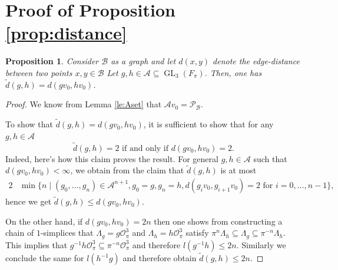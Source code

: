 \documentclass{eptcs}
\newtheorem{proposition}[theorem]{Proposition}
\theoremstyle{remark}
\theoremstyle{definition}
\DeclareMathOperator{\GL}{GL}
\begin{document}
\section{Proof of Proposition \ref{prop:distance}}
\label{proofoflemma5.5}
\begin{proposition}
    Consider $\mathcal{B}$ as a graph and let $d(x,y)$ denote the edge-distance between two points $x,y \in \mathcal{B}$  
    Let $g,h \in \mathcal{A} \subseteq \GL_{3}(F_{\pi})$. 
    Then, one has $\tilde{d}(g,h) = d(g v_{0},hv_{0})$.
\end{proposition}

\begin{proof}
    
We know from Lemma \ref{le:Aset} that $\mathcal{A} v_{0} = \mathcal{P}_{\mathcal{B}}$.

To show that $\tilde{d}(g,h) = d(gv_{0}, hv_{0})$, it is sufficient to show that for any $g,h \in \mathcal{A}$
\begin{equation}
\tilde{d}(g,h) = 2 \text{  if and only if } d(g v_{0} , h v_{0}) = 2.
\end{equation}
Indeed, here's how this claim proves the result. For general $g,h \in \mathcal{A}$ such that $d(g v_{0} , h v_{0}) < \infty$, we obtain from the claim that $\tilde{d}(g,h)$ is at most 
\begin{align}
    2  & \min\{ n \mid (g_{0},\dots,g_{n}) \in \mathcal{A}^{n+1} ,
	g_{0}=g, g_{n} = h, 
    d(g_{i} v_{0},g_{i+1} v_{0}) = 2 \text{ for } i = 0,\dots,n-1
    \},
\end{align}
hence we get $\tilde{d}(g,h) \leq d(g v_{0}, h v_{0})$. 

On the other hand, if $d(g v_{0},h v_{0}) = 2n$ then one shows from constructing a chain of $1$-simplices that 
$ \Lambda_{g}  = g \mathcal{O}_{\pi}^{3}$ and $\Lambda_{h} = h \mathcal{O}_{\pi}^{3}$ satisfy $ \pi^{n} \Lambda_{h} \subseteq \Lambda_{g} \subseteq \pi^{-n}\Lambda_{h}$. This implies that $g^{-1} h \mathcal{O}_{\pi}^{3} \subseteq \pi^{-n} \mathcal{O}_{\pi}^{3}$ and therefore $l(g^{-1}h) \leq 2n$. Similarly we conclude the same for $l(h^{-1}g)$ and therefore obtain $\tilde{d}(g,h) \leq 2n$.


\end{proof}
\end{document}
